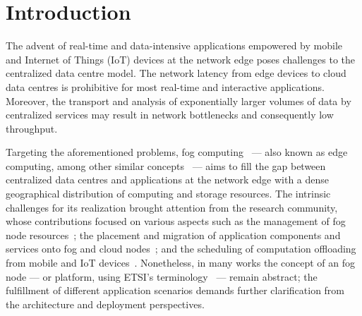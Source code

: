\section{Introduction}

The advent of real-time and data-intensive applications empowered by mobile and Internet of Things (IoT) devices 
at the network edge 
poses challenges to the centralized data centre model. The network latency from edge devices to cloud data centres is prohibitive for most real-time and interactive applications.
Moreover, the transport and analysis of exponentially larger volumes of data by centralized services may result in network bottlenecks and consequently low throughput. 

Targeting the aforementioned problems, fog computing~\cite{Bonomi:2012} --- also known as edge computing, among other similar concepts~\cite{Satyanarayanan:2009,Taleb:2013,ETSI:MEC:2016:03} --- aims to fill the gap between centralized data centres and applications at the network edge with a dense geographical distribution of computing and storage resources. The intrinsic challenges for its realization brought attention from the research community, whose contributions focused on various aspects such as the management of fog node resources~\cite{N.Wang:2017}; the placement and migration of application components and services onto fog and cloud nodes~\cite{Wang:2015a,Wang:2017,Machen:2018}; and the scheduling of computation offloading from mobile and IoT devices~\cite{Liu:2016, OrsiniBL16}. Nonetheless, in many works the concept of an fog node --- or platform, using ETSI's terminology~\cite{ETSI:MEC:2016:03} --- remain abstract; the fulfillment of different application scenarios demands further clarification from the architecture and deployment perspectives.











